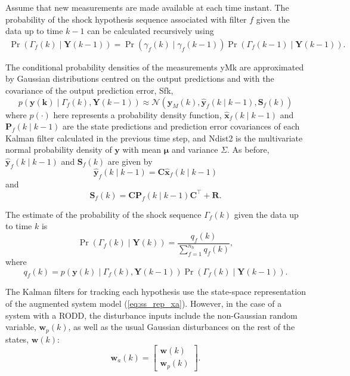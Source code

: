 Assume that new measurements are made available at each time instant. The probability of the shock hypothesis sequence associated with filter $f$ given the data up to time $k-1$ can be calculated recursively using
\begin{multline} \label{eq:Pr_Gammak_given_Ykm1}
	\Pr(\Gamma_f(k) \mid \mathbf{Y}(k-1)) = 
	\Pr(\gamma_f(k) \mid \gamma_f(k-1)) \Pr(\Gamma_f(k-1) \mid \mathbf{Y}(k-1)).
\end{multline}

The conditional probability densities of the measurements \gls{yMk} are approximated by Gaussian distributions centred on the output predictions and with the covariance of the output prediction error, \gls{Sfk},
\begin{equation} \label{eq:p_yk_given_Gammak_Ykm1}
	p(\mathbf{y(k)} \mid \Gamma_f(k), \mathbf{Y}(k-1)) \approx \mathcal{N}\left(\mathbf{y}_M(k), \mathbf{\hat{y}}_{f}(k \mid k-1),	\mathbf{S}_f(k) \right)
\end{equation}
where $p(\cdot)$ here represents a probability density function, $\mathbf{\hat{x}}_{f}(k \mid k-1)$ and $\mathbf{P}_f(k \mid k-1)$ are the state predictions and prediction error covariances of each Kalman filter calculated in the previous time step, and \gls{Ndist2} is the multivariate normal probability density of $\mathbf{y}$ with mean $\mathbf{\mu}$ and variance $\Sigma$. As before, $\mathbf{\hat{y}}_{f}(k \mid k-1)$ and $\mathbf{S}_f(k) $ are given by 
\begin{equation} \label{eq:yfk_pred}
	\mathbf{\hat{y}}_{f}(k \mid k-1) = \mathbf{C}\mathbf{\hat{x}}_{f}(k \mid k-1)
\end{equation}
and
\begin{equation} \label{eq:Sfk}
	\mathbf{S}_f(k) = \mathbf{C}\mathbf{P}_f(k \mid k-1)\mathbf{C}^\intercal + \mathbf{R}.
\end{equation}

The estimate of the probability of the shock sequence $\Gamma_f(k)$ given the data up to time $k$ is
\begin{equation} \label{eq:Pr_Gammak_given_Yk}
	\Pr(\Gamma_f(k) \mid \mathbf{Y}(k)) = \frac{q_f(k)}{\sum_{f=1}^{n_h} q_f(k)},
\end{equation}
where
\begin{equation} \label{eq:qfk}
	q_f(k) = p(\mathbf{y}(k) \mid \Gamma_f(k), \mathbf{Y}(k-1)) \Pr(\Gamma_f(k) \mid \mathbf{Y}(k-1)).
\end{equation}

The Kalman filters for tracking each hypothesis use the state-space representation of the augmented system model (\ref{eq:ss_rep_xa}). 
However, in the case of a system with a \gls{RODD}, the disturbance inputs include the non-Gaussian random variable, $\mathbf{w}_p(k)$, as well as the usual Gaussian disturbances on the rest of the states, $\mathbf{w}(k)$:
\begin{equation} \label{eq:wak}
	\mathbf{w}_a(k) = \begin{bmatrix}
		\mathbf{w}(k) \\
		\mathbf{w}_p(k)
	\end{bmatrix}.
\end{equation}

